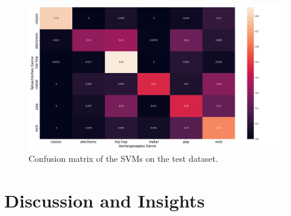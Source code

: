 \documentclass[
  12pt,
  bibliography=totoc,     %
  captions=tableheading,  %
  titlepage=firstiscover, %
]{scrartcl}
\begin{document}
\begin{figure}[H]
  \centering
  \includegraphics[scale=0.33]{figures/svm/confusion_matrix_svm.png}
  \caption{Confusion matrix of the SVMs on the test dataset.}
  \label{fig:conf_svm}
\end{figure}
\noindent

\section{Discussion and Insights}
\newpage
\printbibliography
\end{document}
